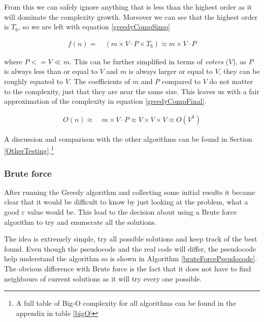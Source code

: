 \documentclass[12pt]{report}
\begin{document}
From this we can safely ignore anything that is less than the highest order as it will dominate the complexity growth. Moreover we can see that the highest order is $T_6$, so we are left with equation \ref{greedyCompSimp}

\begin{equation}\label{greedyCompSimp}
\begin{aligned}
	f(n) ={} & \ (m \times V \cdot P \times T_6) \approx m \times V \cdot P
\end{aligned}
\end{equation}

where $P <= V \ll m$. This can be further simplified in terms of \textit{voters} ($V$), as $P$ is always less than or equal to $V$ and $m$ is always larger or equal to $V$, they can be roughly equated to $V$. The coefficients of $m$ and $P$ compared to $V$ do not matter to the complexity, just that they are near the same size. This leaves us with a fair approximation of the complexity in equation \ref{greedyCompFinal}.

\begin{equation}\label{greedyCompFinal}
\begin{aligned}
	O(n) \approx{} & \ m \times V \cdot P \approx V \times V \times V \approx O(V^3)
\end{aligned}
\end{equation}

A discussion and comparison with the other algorithms can be found in Section \ref{OtherTesting}.\footnote{A full table of Big-O complexity for all algorithms can be found in the appendix in table \ref{bigO}}

\subsubsection{Brute force}
After running the Greedy algorithm and collecting some initial results it became clear that it would be difficult to know by just looking at the problem, what a good $\varepsilon$ value would be. This lead to the decision about using a Brute force algorithm to try and enumerate all the solutions.

The idea is extremely simple, try all possible solutions and keep track of the best found. Even though the pseudocode and the real code will differ, the pseudocode help understand the algorithm so is shown in Algorithm \ref{bruteForcePseudocode}. The obvious difference with Brute force is the fact that it does not have to find neighbours of current solutions as it will try every one possible.
\end{document}
